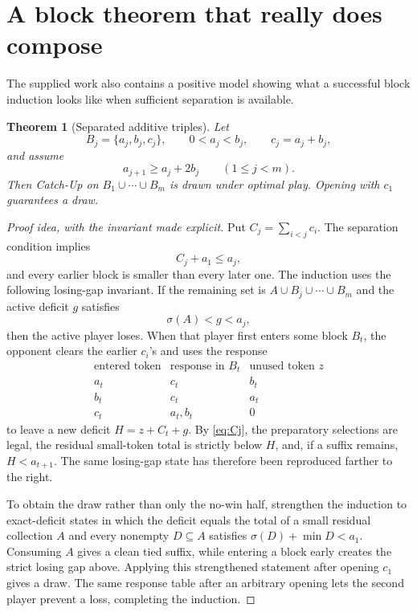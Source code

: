 \documentclass[11pt]{article}
\newtheorem{theorem}{Theorem}
\theoremstyle{remark}
\newcommand{\sm}[1]{\sigma(#1)}
\begin{document}
\section{A block theorem that really does compose}
The supplied work also contains a positive model showing what a successful
block induction looks like when sufficient separation is available.

\begin{theorem}[Separated additive triples]\label{thm:additive-blocks}
Let
\[
B_j=\{a_j,b_j,c_j\},\qquad 0<a_j<b_j,\qquad c_j=a_j+b_j,
\]
and assume
\[
a_{j+1}\ge a_j+2b_j\qquad(1\le j<m).
\]
Then Catch-Up on $B_1\cup\cdots\cup B_m$ is drawn under optimal play.
Opening with $c_1$ guarantees a draw.
\end{theorem}

\begin{proof}[Proof idea, with the invariant made explicit]
Put $C_j=\sum_{i<j}c_i$.  The separation condition implies
\begin{equation}\label{eq:Cj}
C_j+a_1\le a_j,
\end{equation}
and every earlier block is smaller than every later one.  The induction uses
the following losing-gap invariant.  If the remaining set is
$A\cup B_j\cup\cdots\cup B_m$ and the active deficit $g$ satisfies
\[
\sm A<g<a_j,
\]
then the active player loses.  When that player first enters some block
$B_t$, the opponent clears the earlier $c_i$'s and uses the response
\[
\begin{array}{c|c|c}
\text{entered token}&\text{response in }B_t&\text{unused token }z\\\hline
a_t&c_t&b_t\\
b_t&c_t&a_t\\
c_t&a_t,b_t&0
\end{array}
\]
to leave a new deficit $H=z+C_t+g$.  By \eqref{eq:Cj}, the preparatory
selections are legal, the residual small-token total is strictly below $H$,
and, if a suffix remains, $H<a_{t+1}$.  The same losing-gap state has therefore
been reproduced farther to the right.

To obtain the draw rather than only the no-win half, strengthen the induction
to exact-deficit states in which the deficit equals the total of a small
residual collection $A$ and every nonempty $D\subseteq A$ satisfies
$\sm D+\min D<a_1$.  Consuming $A$ gives a clean tied suffix, while entering a
block early creates the strict losing gap above.  Applying this strengthened
statement after opening $c_1$ gives a draw.  The same response table after an
arbitrary opening lets the second player prevent a loss, completing the
induction.
\end{proof}
\end{document}
